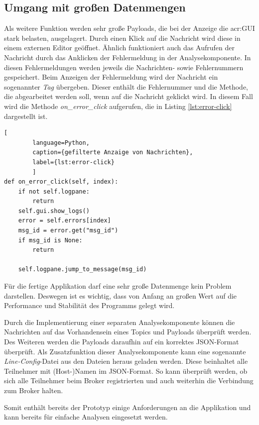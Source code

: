     \subsection{Umgang mit großen Datenmengen}
        Als weitere Funktion werden sehr große Payloads, die bei der Anzeige die \acrshort{acr:GUI} stark belasten, ausgelagert. Durch einen Klick auf die Nachricht wird diese in einem externen Editor geöffnet. Ähnlich funktioniert auch das Aufrufen der Nachricht durch das Anklicken der Fehlermeldung in der Analysekomponente. In diesen Fehlermeldungen werden jeweils die Nachrichten- sowie Fehlernummern gespeichert. Beim Anzeigen der Fehlermeldung wird der Nachricht ein sogenannter \textit{Tag} übergeben. Dieser enthält die Fehlernummer und die Methode, die abgearbeitet werden soll, wenn auf die Nachricht geklickt wird. In diesem Fall wird die Methode \textit{on\_error\_click} aufgerufen, die in Listing \ref{lst:error-click} dargestellt ist.
        \begin{lstlisting}[
        language=Python, 
        caption={gefilterte Anzaige von Nachrichten},
        label={lst:error-click}
        ]
def on_error_click(self, index):
    if not self.logpane:
        return
    self.gui.show_logs()
    error = self.errors[index]
    msg_id = error.get("msg_id")
    if msg_id is None:
        return
    
    self.logpane.jump_to_message(msg_id)
        \end{lstlisting}

        Für die fertige Applikation darf eine sehr große Datenmenge kein Problem darstellen. Deswegen ist es wichtig, dass von Anfang an großen Wert auf die Performance und Stabilität des Programms gelegt wird. 

        Durch die Implementierung einer separaten Analysekomponente können die Nachrichten auf das Vorhandensein eines Topics und Payloads überprüft werden. Des Weiteren werden die Payloads daraufhin auf ein korrektes JSON-Format überprüft. Als Zusatzfunktion dieser Analysekomponente kann eine sogenannte \textit{Line-Config}-Datei aus den Dateien heraus geladen werden. Diese beinhaltet alle Teilnehmer mit (Host-)Namen im JSON-Format. So kann überprüft werden, ob sich alle Teilnehmer beim Broker registrierten und auch weiterhin die Verbindung zum Broker halten.

        Somit enthält bereits der Prototyp einige Anforderungen an die Applikation und kann bereits für einfache Analysen eingesetzt werden. 
